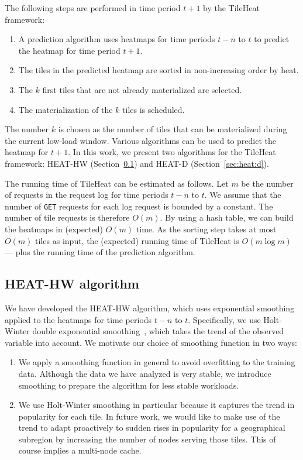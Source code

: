 \documentclass[11pt, oneside]{report}
\begin{document}
The following steps are performed in time period $t+1$ by the TileHeat framework:
%
\begin{enumerate}
\item A prediction algorithm uses heatmaps for time periods $t-n$ to $t$ to predict the heatmap for time period $t+1$.
\item The tiles in the predicted heatmap are sorted in non-increasing order by heat.
\item The $k$ first tiles that are not already materialized are selected.
\item The materialization of the $k$ tiles is scheduled.
\end{enumerate}

The number $k$ is chosen as the number of tiles that can be materialized during the current low-load window. Various algorithms can be used to predict the heatmap for $t + 1$. In this work, we present two algorithms for the TileHeat framework: HEAT-HW (Section~\ref{sec:heat:hw}) and HEAT-D (Section~\ref{sec:heat:d}).

The running time of TileHeat can be estimated as follows. Let $m$ be the number of requests in the request log for time periods $t-n$ to $t$. We assume that the number of \texttt{GET} requests for each log request is bounded by a constant. The number of tile requests is therefore $O(m)$. By using a hash table, we can build the heatmaps in (expected) $O(m)$ time. As the sorting step takes at most $O(m)$ tiles as input, the (expected) running time of TileHeat is $O(m \log m)$ --- plus the running time of the prediction algorithm. 

\subsection{HEAT-HW algorithm}
\label{sec:heat:hw}
We have developed the HEAT-HW algorithm, which uses exponential smoothing applied to the heatmaps for time periods $t-n$ to $t$. Specifically, we use Holt-Winter double exponential smoothing~\cite{chatfield88}, which takes the trend of the observed variable into account. We motivate our choice of smoothing function in two ways:

\begin{enumerate}
\item We apply a smoothing function in general to avoid overfitting to the training data. Although the data we have analyzed is very stable, we introduce smoothing to prepare the algorithm for less stable workloads.
\item We use Holt-Winter smoothing in particular because it captures the trend in popularity for each tile. In future work, we would like to make use of the trend to adapt proactively to sudden rises in popularity for a geographical subregion by increasing the number of nodes serving those tiles. This of course implies a multi-node cache.
\end{enumerate}
\end{document}
